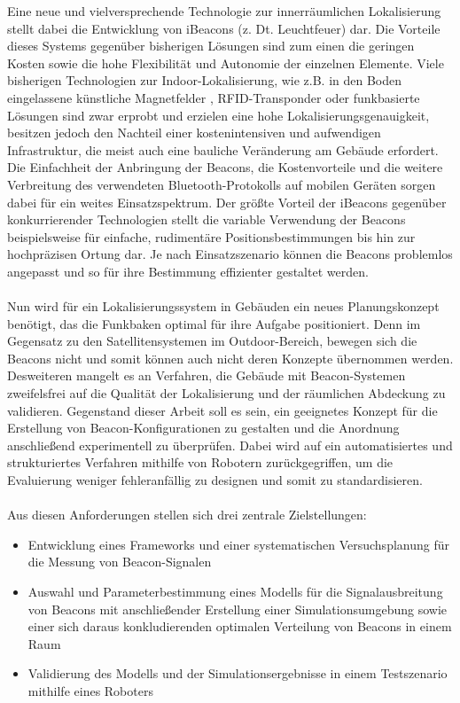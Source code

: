 Eine neue und vielversprechende Technologie zur innerräumlichen Lokalisierung stellt dabei die Entwicklung von iBeacons (z. Dt. Leuchtfeuer) dar. Die Vorteile dieses Systems gegenüber bisherigen Lösungen sind zum einen die geringen Kosten sowie die hohe Flexibilität und Autonomie der einzelnen Elemente. Viele bisherigen Technologien zur Indoor-Lokalisierung, wie z.B. in den Boden eingelassene künstliche Magnetfelder \cite{Magnet}, RFID-Transponder \cite{RFID} oder funkbasierte Lösungen \cite{WLAN} sind zwar erprobt und erzielen eine hohe Lokalisierungsgenauigkeit, besitzen jedoch den Nachteil einer kostenintensiven und aufwendigen Infrastruktur, die meist auch eine bauliche Veränderung am Gebäude erfordert. Die Einfachheit der Anbringung der Beacons, die Kostenvorteile und die weitere Verbreitung des verwendeten Bluetooth-Protokolls auf mobilen Geräten sorgen dabei für ein weites Einsatzspektrum. Der größte Vorteil der iBeacons gegenüber konkurrierender Technologien stellt die variable Verwendung der Beacons beispielsweise für einfache, rudimentäre Positionsbestimmungen bis hin zur hochpräzisen Ortung dar. Je nach Einsatzszenario können die Beacons problemlos angepasst und so für ihre Bestimmung effizienter gestaltet werden.\\ \\
Nun wird für ein Lokalisierungssystem in Gebäuden ein neues Planungskonzept benötigt, das die Funkbaken optimal für ihre Aufgabe positioniert. Denn im Gegensatz zu den Satellitensystemen im Outdoor-Bereich, bewegen sich die Beacons nicht und somit können auch nicht deren Konzepte übernommen werden. Desweiteren mangelt es an Verfahren, die Gebäude mit Beacon-Systemen zweifelsfrei auf die Qualität der Lokalisierung und der räumlichen Abdeckung zu validieren. Gegenstand dieser Arbeit soll es sein, ein geeignetes Konzept für die Erstellung von Beacon-Konfigurationen zu gestalten und die Anordnung anschließend experimentell zu überprüfen. Dabei wird auf ein automatisiertes und strukturiertes Verfahren mithilfe von Robotern zurückgegriffen, um die Evaluierung weniger fehleranfällig zu designen und somit zu standardisieren.\\ \\
Aus diesen Anforderungen stellen sich drei zentrale Zielstellungen:
\begin{itemize}
\item Entwicklung eines Frameworks und einer systematischen Versuchsplanung für die Messung von Beacon-Signalen
\item Auswahl und Parameterbestimmung eines Modells für die Signalausbreitung von Beacons mit anschließender Erstellung einer Simulationsumgebung sowie einer sich daraus konkludierenden optimalen Verteilung von Beacons in einem Raum 
\item Validierung des Modells und der Simulationsergebnisse in einem Testszenario mithilfe eines Roboters  
\end{itemize}
